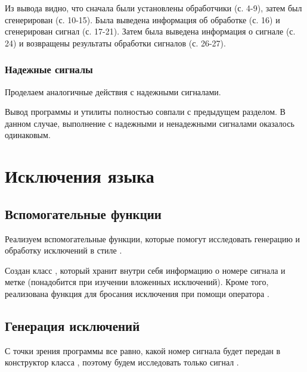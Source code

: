 
Из вывода  видно, что сначала были установлены обработчики (с. 4-9), затем был сгенерирован  (с. 10-15). Была выведена информация об обработке (с. 16) и сгенерирован сигнал  (с. 17-21). Затем была выведена информация о сигнале (с. 24) и возвращены результаты обработки сигналов (с. 26-27).

\subsubsection{Надежные сигналы}

Проделаем аналогичные действия с надежными сигналами.


Вывод программы и утилиты  полностью совпали с предыдущем разделом. В данном случае, выполнение с надежными и ненадежными сигналами оказалось одинаковым.

\section{Исключения языка }

\subsection{Вспомогательные функции}

Реализуем вспомогательные функции, которые помогут исследовать генерацию и обработку исключений в стиле .





Создан класс , который хранит внутри себя информацию о номере сигнала и метке (понадобится при изучении вложенных исключений). Кроме того, реализована функция  для бросания исключения при помощи оператора .

\subsection{Генерация исключений}

С точки зрения программы все равно, какой номер сигнала будет передан в конструктор класса , поэтому будем исследовать только сигнал .

